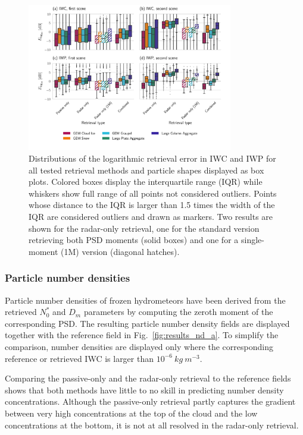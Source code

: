\documentclass[journal abbreviation, manuscript]{copernicus}
\begin{document}
\begin{figure}[!h]
\centering \includegraphics[width = 0.8\textwidth]{../plots/results_box}
\caption{Distributions of the logarithmic retrieval error in IWC and IWP for all
  tested retrieval methods and particle shapes displayed as box plots. Colored
  boxes display the interquartile range (IQR) while whiskers show full range of
  all points not considered outliers. Points whose distance to the IQR is larger
  than 1.5 times the width of the IQR are considered outliers and drawn as
  markers. Two results are shown for the radar-only retrieval, one for the
  standard version retrieving both PSD moments (solid boxes) and one for a
  single-moment (1M) version (diagonal hatches).}
\label{fig:boxes}
\end{figure}

\subsubsection{Particle number densities}

Particle number densities of frozen hydrometeors have been derived from the
retrieved $N_0^*$ and $D_m$ parameters by computing the zeroth moment of the
corresponding PSD. The resulting particle number density fields are displayed
together with the reference field in Fig.~\ref{fig:results_nd_a}. To simplify
the comparison, number densities are displayed only where the corresponding
reference or retrieved IWC is larger than $10^{-6}\ \unit{kg\ m^{-3}}$.

Comparing the passive-only and the radar-only retrieval to the reference fields
shows that both methods have little to no skill in predicting number density
concentrations. Although the passive-only retrieval partly captures the gradient
between very high concentrations at the top of the cloud and the low
concentrations at the bottom, it is not at all resolved in the radar-only
retrieval.
\end{document}
